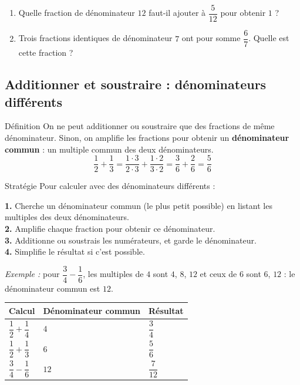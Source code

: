 \begin{enumerate}[leftmargin=*,align=parleft, label=\alph*), itemsep=9pt]
\item Quelle fraction de dénominateur $12$ faut-il ajouter à $\dfrac{5}{12}$ pour obtenir $1$ ?
\item Trois fractions identiques de dénominateur $7$ ont pour somme $\dfrac{6}{7}$. Quelle est cette fraction ?
\end{enumerate}

\subsection{Additionner et soustraire : dénominateurs différents}
 
\begin{regle}{Définition}
On ne peut additionner ou soustraire que des fractions de même dénominateur. Sinon, on \textcolor{themeColor}{amplifie} les fractions pour obtenir un \textbf{dénominateur commun} : un multiple commun des deux dénominateurs.
\[\dfrac{1}{2}+\dfrac{1}{3}=\dfrac{1 \cdot 3}{2 \cdot 3}+\dfrac{1 \cdot 2}{3 \cdot 2}=\dfrac{3}{6}+\dfrac{2}{6}=\dfrac{5}{6}\]
\end{regle}
 
\vspace{20pt}
\begin{astuce}{Stratégie}
Pour calculer avec des dénominateurs différents :
 
\vspace{5pt}
\textbf{1.} Cherche un dénominateur commun (le plus petit possible) en listant les multiples des deux dénominateurs.\\
\textbf{2.} Amplifie chaque fraction pour obtenir ce dénominateur.\\
\textbf{3.} Additionne ou soustrais les numérateurs, et garde le dénominateur.\\
\textbf{4.} Simplifie le résultat si c'est possible.
 
\vspace{5pt}
\textit{Exemple :} pour $\dfrac{3}{4}-\dfrac{1}{6}$, les multiples de $4$ sont $4$, $8$, $12$ et ceux de $6$ sont $6$, $12$ : le dénominateur commun est $12$.
\end{astuce}
 
\vspace{20pt}
\def\arraystretch{3}
\begin{tabularx}{\linewidth}{|>{\centering\arraybackslash}X|>{\centering\arraybackslash}X|>{\centering\arraybackslash}X|}
\hline
\cellcolor{themeNO!30}\textbf{Calcul} & \cellcolor{themeNO!30}\textbf{Dénominateur commun} & \cellcolor{themeNO!30}\textbf{Résultat} \\\hline
$\dfrac{1}{2}+\dfrac{1}{4}$ & $4$ & $\dfrac{3}{4}$ \\\hline
$\dfrac{1}{2}+\dfrac{1}{3}$ & $6$ & $\dfrac{5}{6}$ \\\hline
$\dfrac{3}{4}-\dfrac{1}{6}$ & $12$ & $\dfrac{7}{12}$ \\\hline
\end{tabularx}
\def\arraystretch{1}
 
